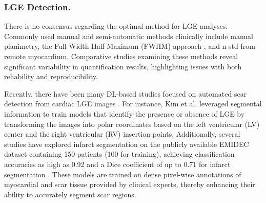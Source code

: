 \subsubsection{LGE Detection.}

There is no consensus regarding the optimal method for LGE analyses. Commonly used manual and semi-automatic methods clinically include manual planimetry, the Full Width Half Maximum (FWHM) approach \cite{amado2004accurate, hsu2006quantitative}, and n-std from remote myocardium. Comparative studies examining these methods \cite{flett2011evaluation, heiberg2022infarct} reveal significant variability in quantification results, highlighting issues with both reliability and reproducibility.

Recently, there have been many DL-based studies focused on automated scar detection from cardiac LGE images \cite{zhang2021cascaded, kim2024deep, girum2021automatic, yang2021hybrid}. For instance, Kim et al. \cite{kim2024deep} leveraged segmental information to train models that identify the presence or absence of LGE by transforming the images into polar coordinates based on the left ventricular (LV) center and the right ventricular (RV) insertion points. Additionally, several studies have explored infarct segmentation on the publicly available EMIDEC dataset \cite{lalande2020emidec} containing 150 patients (100 for training), achieving classification accuracies as high as 0.92 \cite{lalande2022deep} and a Dice coefficient of up to 0.71 for infarct segmentation \cite{zhang2021cascaded}. These models are trained on dense pixel-wise annotations of myocardial and scar tissue provided by clinical experts, thereby enhancing their ability to accurately segment scar regions.